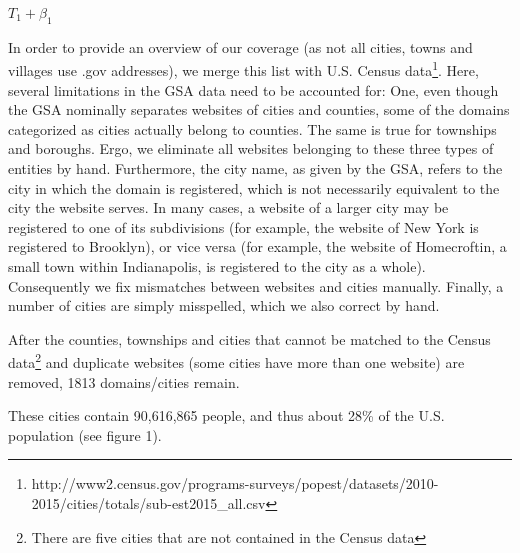 \documentclass[11pt]{article}
\begin{document}
$T_{1}+\beta_1$

In order to provide an overview of our coverage (as not all cities, towns and villages use .gov addresses), we merge this list with U.S. Census data\footnote{http://www2.census.gov/programs-surveys/popest/datasets/2010-2015/cities/totals/sub-est2015\_all.csv}. Here, several limitations in the GSA data need to be accounted for: One, even though the GSA nominally separates websites of cities and counties, some of the domains categorized as cities actually belong to counties. The same is true for townships and boroughs. Ergo, we eliminate all websites belonging to these three types of entities by hand. Furthermore, the city name, as given by the GSA, refers to the city in which the domain is registered, which is not necessarily equivalent to the city the website serves. In many cases, a website of a larger city may be registered to one of its subdivisions (for example, the website of New York is registered to Brooklyn), or vice versa (for example, the website of Homecroftin, a small town within Indianapolis, is registered to the city as a whole). Consequently we fix mismatches between websites and cities manually. Finally, a number of cities are simply misspelled, which we also correct by hand.

After the counties, townships and cities that cannot be matched to the Census data\footnote{There are five cities that are not contained in the Census data} and duplicate websites (some cities have more than one website) are removed, 1813 domains/cities remain.

These cities contain 90,616,865 people, and thus about 28\% of the U.S. population (see figure 1).
\end{document}
